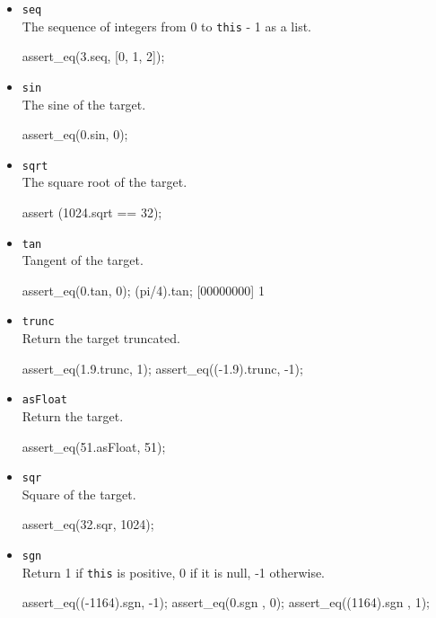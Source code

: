 \begin{itemize}
\item \lstinline|seq|\\
  The sequence of integers from 0 to \lstinline|this| - 1 as a list.
\begin{urbiscript}
assert_eq(3.seq, [0, 1, 2]);
\end{urbiscript}

\item \lstinline|sin|\\
  The sine of the target.
\begin{urbiscript}
assert_eq(0.sin, 0);
\end{urbiscript}

\item \lstinline|sqrt|\\
  The square root of the target.
\begin{urbiscript}
assert (1024.sqrt == 32);
\end{urbiscript}

\item \lstinline|tan|\\
  Tangent of the target.
\begin{urbiscript}
assert_eq(0.tan, 0);
(pi/4).tan;
[00000000] 1
\end{urbiscript}

\item \lstinline|trunc|\\
  Return the target truncated.
\begin{urbiscript}
assert_eq(1.9.trunc, 1);
assert_eq((-1.9).trunc, -1);
\end{urbiscript}

\item \lstinline|asFloat|\\
  Return the target.
\begin{urbiscript}
assert_eq(51.asFloat, 51);
\end{urbiscript}

\item \lstinline|sqr|\\
  Square of the target.
\begin{urbiscript}
assert_eq(32.sqr, 1024);
\end{urbiscript}

\item \lstinline|sgn|\\
  Return 1 if \lstinline|this| is positive, 0 if it is null, -1
  otherwise.
\begin{urbiscript}
assert_eq((-1164).sgn, -1);
assert_eq(0.sgn      , 0);
assert_eq((1164).sgn , 1);
\end{urbiscript}


\end{itemize}
